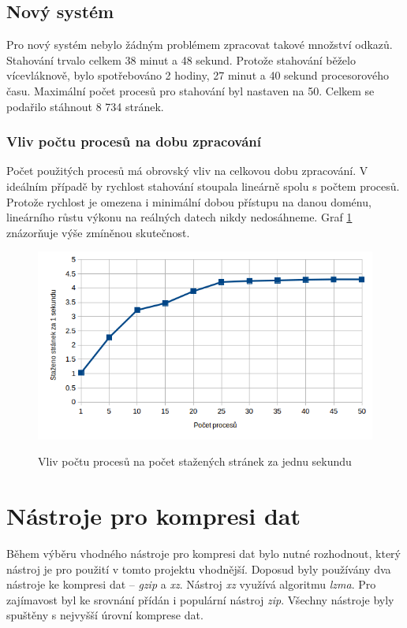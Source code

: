 \subsection{Nový systém}
Pro nový systém nebylo žádným problémem zpracovat takové množství odkazů. Stahování
trvalo celkem 38 minut a 48 sekund. Protože stahování běželo vícevláknově, bylo
spotřebováno 2 hodiny, 27 minut a 40 sekund procesorového času. Maximální počet
procesů pro stahování byl nastaven na 50. Celkem se podařilo stáhnout 8 734 stránek.

\subsubsection{Vliv počtu procesů na dobu zpracování}
Počet použitých procesů má obrovský vliv na celkovou dobu zpracování. V
ideálním případě by rychlost stahování stoupala lineárně spolu s počtem procesů. Protože
rychlost je omezena i minimální dobou přístupu na danou doménu, lineárního růstu výkonu
na reálných datech nikdy nedosáhneme. Graf \ref{graph:stahovani} znázorňuje výše
zmíněnou skutečnost.

\begin{figure}[H]
    \begin{center}
        \label{graph:stahovani}
        \includegraphics[width=1.0\textwidth]{obrazky-figures/graph_stahovani.png}
        \caption{Vliv počtu procesů na počet stažených stránek za jednu sekundu}
    \end{center}
\end{figure}

\section{Nástroje pro kompresi dat}
Během výběru vhodného nástroje pro kompresi dat bylo nutné rozhodnout, který nástroj
je pro použití v tomto projektu vhodnější. Doposud byly používány dva nástroje ke kompresi dat -- \textit{gzip}
a \textit{xz}. Nástroj \textit{xz} využívá algoritmu \textit{lzma}. Pro zajímavost byl ke srovnání
přídán i populární nástroj \textit{zip}. Všechny nástroje byly spuštěny s nejvyšší
úrovní komprese dat.

